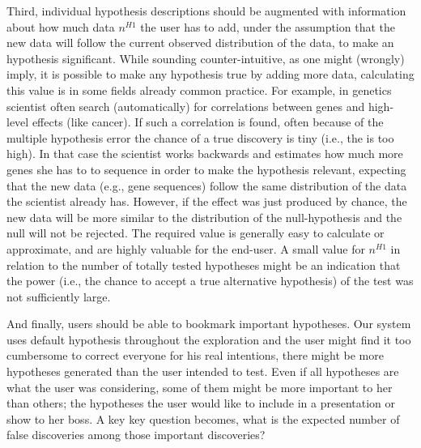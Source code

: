 Third, individual hypothesis descriptions should be augmented with information about how much data $n^{H1}$ the user has to add, under the assumption that the new data will follow the current observed distribution of the data, to make an hypothesis significant. 
While sounding counter-intuitive, as one might (wrongly) imply, it is possible to make any hypothesis true by adding more data, calculating this value is in some fields already common practice. 
For example, in genetics scientist often search (automatically) for correlations between genes and high-level effects (like cancer). 
If such a correlation is found, often because of the multiple hypothesis error the chance of a true discovery is tiny (i.e., the \pval is too high). 
In that case the scientist works backwards and estimates how much more genes she has to to sequence in order to make the hypothesis relevant, expecting that the new data (e.g., gene sequences) follow the same distribution of the data the scientist already has.
However, if the effect was just produced by chance, the new data will be more similar to the distribution of the null-hypothesis and the null will not be rejected.  
The required value is generally easy to calculate or approximate,  and are highly valuable for the end-user. 
A small value for $n^{H1}$ in relation to the number of totally tested hypotheses might be an indication that the power (i.e., the chance to accept a true alternative hypothesis) of the test was not sufficiently large. 

And finally, users should be able to bookmark important hypotheses. 
Our system uses default hypothesis throughout the exploration and the user might find it too cumbersome to correct everyone for his real intentions, there might be more hypotheses generated than the user intended to test. 
Even if all hypotheses are what the user was considering, some of them might be more important to her than others; the hypotheses the user would like to include in a presentation or show to her boss. 
A key key question becomes, what is the expected number of false discoveries among those important discoveries?

